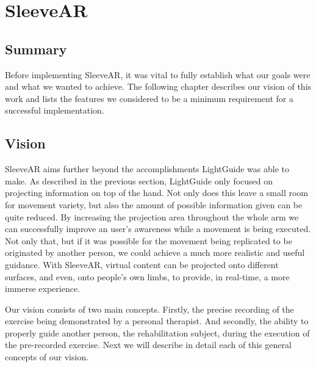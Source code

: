 \chapter{SleeveAR}
\label{sec:sleevear}

\section*{Summary}

Before implementing SleeveAR, it was vital to fully establish what our goals were and what we wanted to achieve. 
The following chapter describes our vision of this work and lists the features we considered to be a minimum requirement for a successful implementation.



\section{Vision}
\label{sec:sleevear:approach}


SleeveAR aims further beyond the accomplishments LightGuide was able to make. 
As described in the previous section, LightGuide only focused on projecting information on top of the hand. Not only does this leave a small room for movement variety, but also the amount of possible information given can be quite reduced.
By increasing the projection area throughout the whole arm we can successfully improve an user's awareness while a movement is being executed. 
 Not only that, but if it was possible for the movement being replicated to be originated by another person, we could achieve a much more realistic and useful guidance.
With SleeveAR, virtual content can be projected onto different surfaces, and even, onto people's own limbs, to provide, in real-time, a more immerse experience. 

Our vision consists of two main concepts. Firstly, the precise recording of the exercise being demonstrated by a personal therapist. 
And secondly, the ability to properly guide another person, the rehabilitation subject, during the execution of the pre-recorded exercise.
Next we will describe in detail each of this general concepts of our vision.


